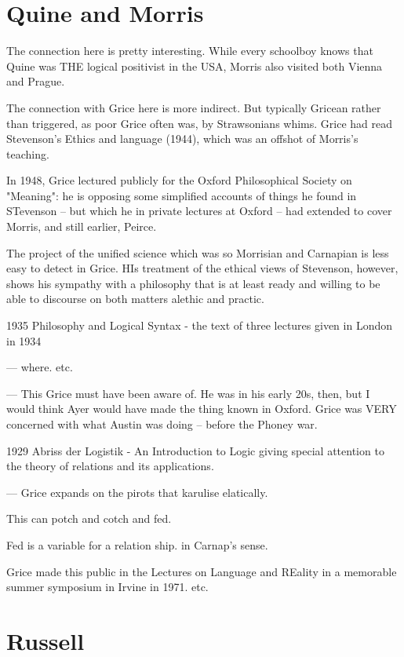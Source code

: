 \documentclass[10pt,titlepage]{book}
\begin{document}
\section{Quine and Morris}
 
The connection here is pretty interesting.
While every schoolboy knows that Quine was THE logical positivist in the USA, Morris also visited both Vienna and Prague.
 
The connection with Grice here is more indirect.
But typically Gricean rather than triggered, as poor Grice often was, by Strawsonians whims.
Grice had read Stevenson's Ethics and language (1944), which was an offshot of Morris's teaching.

In 1948, Grice lectured publicly for the Oxford Philosophical Society  on "Meaning": he is opposing some simplified accounts of things 
he found in  STevenson -- but which he in private lectures at Oxford --  had 
extended to  cover Morris, and still earlier, Peirce.
 
The project of the unified science which was so Morrisian and  
Carnapian is less easy to detect in Grice. HIs treatment of the ethical views of Stevenson, however, shows his sympathy with a philosophy that is at least ready  and willing to be able to discourse on both matters alethic and practic.

1935 Philosophy and Logical Syntax - the text of  three lectures given in 
London in 1934  

--- where. etc.
 
---
This Grice must have been aware of. He was in his early 20s, then, but I  
would think Ayer would have made the thing known in Oxford. Grice was VERY  
concerned with what Austin was doing -- before the Phoney war.

1929 Abriss der Logistik - An Introduction to Logic giving special  
attention to the theory of relations and its applications.
 
 
--- Grice expands on the pirots that karulise elatically.
 
This can potch and cotch and fed.
 
Fed is a variable for a relation ship. in Carnap's sense.
 
Grice made this public in the Lectures on Language and REality in a  memorable summer symposium in Irvine in 1971. etc.
 
\section{Russell}
 
\end{document}
